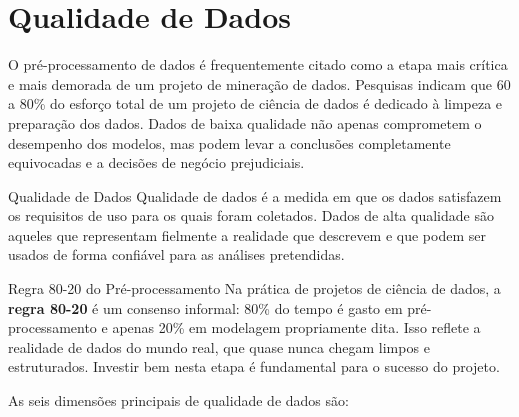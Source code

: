 \documentclass[12pt,a4paper]{article}
\begin{document}
\section{Qualidade de Dados}

O pré-processamento de dados é frequentemente citado como a etapa mais crítica e mais demorada de um projeto de mineração de dados. Pesquisas indicam que 60 a 80\% do esforço total de um projeto de ciência de dados é dedicado à limpeza e preparação dos dados. Dados de baixa qualidade não apenas comprometem o desempenho dos modelos, mas podem levar a conclusões completamente equivocadas e a decisões de negócio prejudiciais.

\begin{definicaobox}{Qualidade de Dados}
Qualidade de dados é a medida em que os dados satisfazem os requisitos de uso para os quais foram coletados. Dados de alta qualidade são aqueles que representam fielmente a realidade que descrevem e que podem ser usados de forma confiável para as análises pretendidas.
\end{definicaobox}

\begin{dicabox}{Regra 80-20 do Pré-processamento}
Na prática de projetos de ciência de dados, a \textbf{regra 80-20} é um consenso informal: 80\% do tempo é gasto em pré-processamento e apenas 20\% em modelagem propriamente dita. Isso reflete a realidade de dados do mundo real, que quase nunca chegam limpos e estruturados. Investir bem nesta etapa é fundamental para o sucesso do projeto.
\end{dicabox}

As seis dimensões principais de qualidade de dados são:
\end{document}
